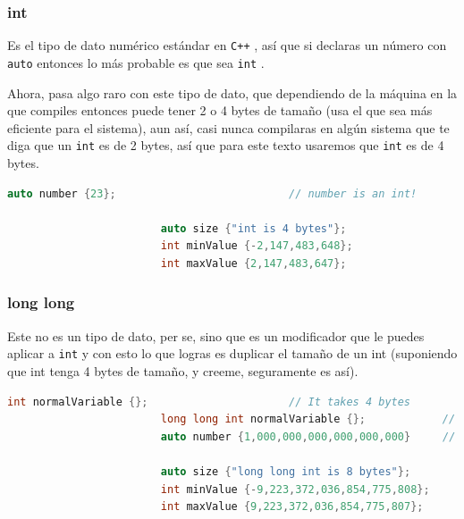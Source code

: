 \documentclass[12pt, fleqn]{report}                             %
\theoremstyle{break}                                            %
\newcommand{\textCode}[1]  { \texttt{#1} }                      %
\newcommand \Cpp  {\textCode{C++} }                               %
\begin{document}
                \clearpage
                \subsubsection{int}

                    Es el tipo de dato numérico estándar en \Cpp, así que si declaras un número
                    con \textCode{auto} entonces lo más probable es que sea \textCode{int}.

                    Ahora, pasa algo raro con este tipo de dato, que dependiendo de la máquina
                    en la que compiles entonces puede tener 2 o 4 bytes de tamaño (usa el que
                    sea más eficiente para el sistema), aun así, casi nunca compilaras en 
                    algún sistema que te diga que un \textCode{int} es de 2 bytes, así que para
                    este texto usaremos que \textCode{int} es de 4 bytes.
                    \begin{lstlisting}[language=C++, gobble=24]
                        auto number {23};                           // number is an int!

                        auto size {"int is 4 bytes"};
                        int minValue {-2,147,483,648};
                        int maxValue {2,147,483,647};
                    \end{lstlisting}

                \subsubsection{long long}

                    Este no es un tipo de dato, per se, sino que es un modificador que le puedes aplicar
                    a \textCode{int} y con esto lo que logras es duplicar el tamaño de un int (suponiendo
                    que int tenga 4 bytes de tamaño, y creeme, seguramente es así).
                    \begin{lstlisting}[language=C++, gobble=24]
                        int normalVariable {};                      // It takes 4 bytes     
                        long long int normalVariable {};            // It takes 8 bytes 
                        auto number {1,000,000,000,000,000,000}     // number is long long  

                        auto size {"long long int is 8 bytes"};
                        int minValue {-9,223,372,036,854,775,808};
                        int maxValue {9,223,372,036,854,775,807};
                    \end{lstlisting}
\end{document}
